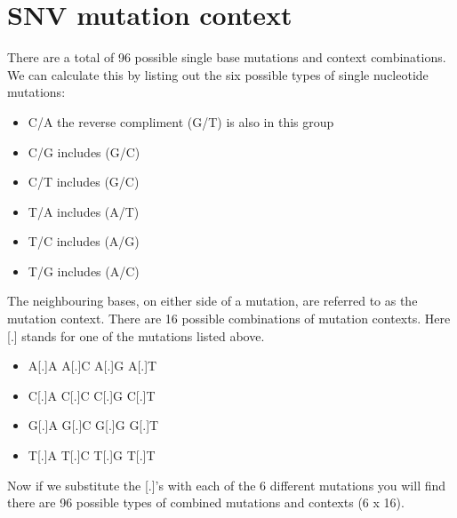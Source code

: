 \section{SNV mutation context}

\begin{information}
There are a total of 96 possible single base mutations and context combinations.
We can calculate this by listing out the six possible types of single
nucleotide mutations:
\vspace{4 mm}
\begin{itemize}
\item C/A \hspace{5 mm} the reverse compliment (G/T) is also in this group 
\item C/G \hspace{5 mm} includes (G/C)
\item C/T \hspace{5 mm} includes (G/C)
\item T/A \hspace{5 mm} includes (A/T)
\item T/C \hspace{5 mm} includes (A/G)
\item T/G \hspace{5 mm} includes (A/C)
\end{itemize}
\vspace{4 mm}
The neighbouring bases, on either side of a mutation, are referred to as the mutation context. 
There are 16 possible combinations of mutation contexts. Here [.] stands for one of the mutations listed above.
\vspace{4 mm}
\begin{itemize}
\item A[.]A \hspace{5 mm} A[.]C \hspace{5 mm} A[.]G \hspace{5 mm} A[.]T
\item C[.]A \hspace{5 mm} C[.]C \hspace{5 mm} C[.]G \hspace{5 mm} C[.]T
\item G[.]A \hspace{5 mm} G[.]C \hspace{5 mm} G[.]G \hspace{5 mm} G[.]T
\item T[.]A \hspace{5 mm} T[.]C \hspace{5 mm} T[.]G \hspace{5 mm} T[.]T
\end{itemize}
\vspace{4 mm}
Now if we substitute the [.]'s with each of the 6 different mutations you will find there are 96 possible types of combined mutations and contexts (6 x 16). 


\end{information}
